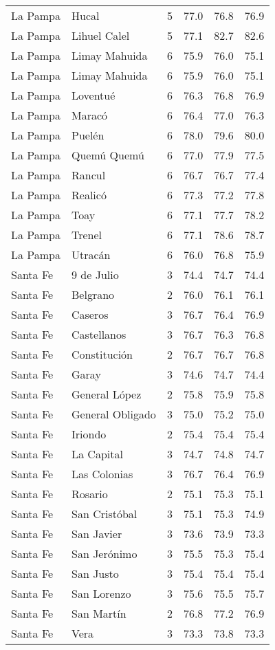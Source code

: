 \documentclass[12pt,spanish,]{article}
\begin{document}
\begin{landscape}
\begin{longtable}[t]{llrrrr}
La Pampa & Hucal & 5 & 77.0 & 76.8 & 76.9\\
La Pampa & Lihuel Calel & 5 & 77.1 & 82.7 & 82.6\\
La Pampa & Limay Mahuida & 6 & 75.9 & 76.0 & 75.1\\
La Pampa & Limay Mahuida & 6 & 75.9 & 76.0 & 75.1\\
\addlinespace
La Pampa & Loventué & 6 & 76.3 & 76.8 & 76.9\\
La Pampa & Maracó & 6 & 76.4 & 77.0 & 76.3\\
La Pampa & Puelén & 6 & 78.0 & 79.6 & 80.0\\
La Pampa & Quemú Quemú & 6 & 77.0 & 77.9 & 77.5\\
La Pampa & Rancul & 6 & 76.7 & 76.7 & 77.4\\
\addlinespace
La Pampa & Realicó & 6 & 77.3 & 77.2 & 77.8\\
La Pampa & Toay & 6 & 77.1 & 77.7 & 78.2\\
La Pampa & Trenel & 6 & 77.1 & 78.6 & 78.7\\
La Pampa & Utracán & 6 & 76.0 & 76.8 & 75.9\\
Santa Fe & 9 de Julio & 3 & 74.4 & 74.7 & 74.4\\
\addlinespace
Santa Fe & Belgrano & 2 & 76.0 & 76.1 & 76.1\\
Santa Fe & Caseros & 3 & 76.7 & 76.4 & 76.9\\
Santa Fe & Castellanos & 3 & 76.7 & 76.3 & 76.8\\
Santa Fe & Constitución & 2 & 76.7 & 76.7 & 76.8\\
Santa Fe & Garay & 3 & 74.6 & 74.7 & 74.4\\
\addlinespace
Santa Fe & General López & 2 & 75.8 & 75.9 & 75.8\\
Santa Fe & General Obligado & 3 & 75.0 & 75.2 & 75.0\\
Santa Fe & Iriondo & 2 & 75.4 & 75.4 & 75.4\\
Santa Fe & La Capital & 3 & 74.7 & 74.8 & 74.7\\
Santa Fe & Las Colonias & 3 & 76.7 & 76.4 & 76.9\\
\addlinespace
Santa Fe & Rosario & 2 & 75.1 & 75.3 & 75.1\\
Santa Fe & San Cristóbal & 3 & 75.1 & 75.3 & 74.9\\
Santa Fe & San Javier & 3 & 73.6 & 73.9 & 73.3\\
Santa Fe & San Jerónimo & 3 & 75.5 & 75.3 & 75.4\\
Santa Fe & San Justo & 3 & 75.4 & 75.4 & 75.4\\
\addlinespace
Santa Fe & San Lorenzo & 3 & 75.6 & 75.5 & 75.7\\
Santa Fe & San Martín & 2 & 76.8 & 77.2 & 76.9\\
Santa Fe & Vera & 3 & 73.3 & 73.8 & 73.3\\*
\end{longtable}
\end{landscape}
\end{document}
